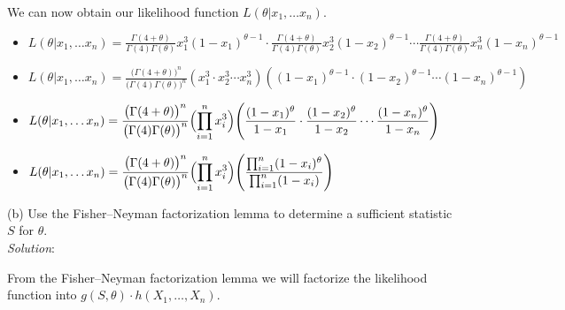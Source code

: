 \documentclass[12pt]{article}
\newcommand{\XB}{\color{black}}
\newcommand{\XV}{\color{violet}}
\begin{document}
We can now obtain our likelihood function $ L(\theta | x_{1}, \dots x_{n}) $. \\
\begin{itemize}
    \item $ \displaystyle L(\theta | x_{1}, \dots x_{n}) = \frac{\Gamma(4 + \theta)}{\Gamma(4)\Gamma(\theta)}x_{1}^{3}(1 - x_{1})^{\theta - 1} \cdot \frac{\Gamma(4 + \theta)}{\Gamma(4)\Gamma(\theta)}x_{2}^{3}(1 - x_{2})^{\theta - 1} \cdots \frac{\Gamma(4 + \theta)}{\Gamma(4)\Gamma(\theta)}x_{n}^{3}(1 - x_{n})^{\theta - 1} $
    \item $ \displaystyle L(\theta | x_{1}, \dots x_{n}) = \frac{ \bigl( \Gamma(4 + \theta) \bigr)^{n}}{ \bigl( \Gamma(4)\Gamma(\theta) \bigr)^{n}} (x_{1}^{3} \cdot x_{2}^{3} \cdots x_{n}^{3})((1 - x_{1})^{\theta - 1} \cdot (1 - x_{2})^{\theta - 1} \cdots (1 - x_{n})^{\theta - 1}) $
    \item $ \displaystyle L(\theta | x_{1}, \dots x_{n}) = \frac{ \bigl( \Gamma(4 + \theta) \bigr)^{n}}{ \bigl( \Gamma(4)\Gamma(\theta) \bigr)^{n}} \Bigl( \prod_{i=1}^{n} x_{i}^{3} \Bigr) \Biggl( \frac{(1 - x_{1})^{\theta}}{1 - x_{1}} \cdot \frac{(1 - x_{2})^{\theta}}{1 - x_{2}} \cdots \frac{(1 - x_{n})^{\theta}}{1 - x_{n}} \Biggr) $
    \item $ \displaystyle L(\theta | x_{1}, \dots x_{n}) = \frac{ \bigl( \Gamma(4 + \theta) \bigr)^{n}}{ \bigl( \Gamma(4)\Gamma(\theta) \bigr)^{n}} \Bigl( \prod_{i=1}^{n} x_{i}^{3} \Bigr) \Biggl( \frac{ \prod_{i=1}^{n} (1 - x_{i})^{\theta} }{ \prod_{i=1}^{n} (1 - x_{i}) } \Biggr) $
\end{itemize}



(b) Use the Fisher–Neyman factorization lemma to determine a sufficient statistic \\
$ S $ for $ \theta $.
\vspace{2.5mm} \\
\textit{Solution}:
\vspace{2.5mm}

\noindent 
From the Fisher–Neyman factorization lemma we will factorize the likelihood function into $ g(S, \theta) \cdot h(X_{1}, \dots , X_{n}) $. \\
\end{document}

